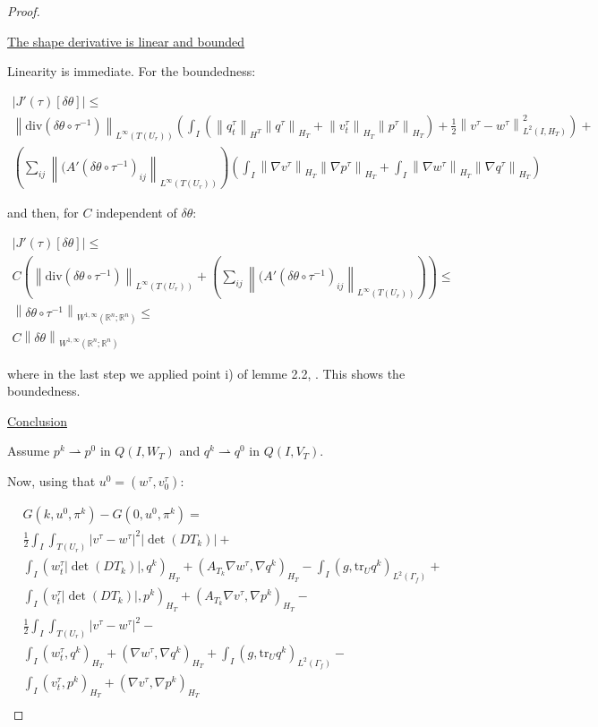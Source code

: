 \documentclass[english,a4paper,10pt,oneside]{scrbook}	%
\theoremstyle{break}
\newenvironment{mproof}[1][\proofname]{%
  \begin{proof}[#1]$ $\par\nobreak\ignorespaces
}{%
  \end{proof}
}
\renewcommand*{\proofname}{Proof}
\theoremstyle{remark}
\newcommand{\mR}{\mathbb{R}}
\newcommand{\norm}[1]{\left\lVert#1\right\rVert}
\newcommand{\tr}{\text{tr}}
\newcommand{\te}{\theta}
\newcommand{\dive}{\text{div}}
\newcommand{\weakc}{\rightharpoonup}
\begin{document}
\begin{mproof}

\underline{The shape derivative is linear and bounded}

Linearity is immediate. For the boundedness:

\begin{align*}
|J'(\tau)[\delta \te]| \leq\\ \norm{\dive(\delta \te\circ  \tau^{-1})}_{L^\infty(T(U_r))}\left (\int_I( \norm{q_t^\tau}_{H^T}\norm{q^\tau}_{H_T}+ \norm{v_t^\tau}_{H_T}\norm{p^\tau}_{H_T})+\frac{1}{2}\norm{v^\tau-w^\tau}^2_{L^2(I,H_T)}\right )+\\
\left(\sum_{ij} \norm{(A'(\delta\te \circ \tau^{-1})_{ij}}_{L^\infty(T(U_r))}\right )\left (
\int_I \norm{\nabla v^\tau}_{H_T} \norm{\nabla p^\tau}_{H_T}+ \int_I \norm{\nabla w^\tau}_{H_T} \norm{\nabla q^\tau}_{H_T}\right )
\end{align*}

and then, for $C$ independent of $\delta \te$:

\begin{align*}
|J'(\tau)[\delta \te]| \leq\\ C \left ( \norm{\dive(\delta \te\circ  \tau^{-1})}_{L^\infty(T(U_r))}+\left(\sum_{ij} \norm{(A'(\delta\te \circ \tau^{-1})_{ij}}_{L^\infty(T(U_r))}\right )\right )\leq\\
\norm{\delta \te \circ \tau^{-1}}_{W^{1,\infty}(\mR^n;\mR^n)}\leq \\
C\norm{\delta \te }_{W^{1,\infty}(\mR^n;\mR^n)}
\end{align*}

where in the last step we applied point i) of lemme 2.2, \cite{murat}. This shows the boundedness.

\underline{Conclusion}

Assume $p^k \weakc p^0$ in $Q(I,W_T)$ and $q^k \weakc q^0$ in $Q(I,V_T)$.

Now, using that $u^0=(w^\tau, v_0^\tau)$:

\begin{align*}
G(k,u^0,\pi^k)-G(0,u^0,\pi^k) =\\
\frac{1}{2}\int_I \int_{T(U_r)}|v^\tau-w^\tau|^2|\det(DT_k)|+\\
\int_I ( w_t^\tau |\det(DT_k)| , q^k)_{H_T}+ (A_{T_k}\nabla w^\tau, \nabla q^k)_{H_T} -\int_I(g,\tr_{U} q^k)_{L^2(\Gamma_f)} +\\ \int_I (v_t^\tau |\det(DT_k)|,p^k )_{H_T} + (A_{T_k} \nabla v^\tau, \nabla p^k)_{H_T} - \\
\frac{1}{2}\int_I \int_{T(U_r)}|v^\tau-w^\tau|^2-\\
\int_I ( w_t^\tau , q^k )_{H_T}+(\nabla w^\tau, \nabla q^k)_{H_T} +\int_I(g,\tr_{U} q^k)_{L^2(\Gamma_f)} -\\ \int_I (v_t^\tau,p^k )_{H_T} + ( \nabla v^\tau, \nabla p^k)_{H_T} \\
\end{align*}


\end{mproof}
\end{document}
